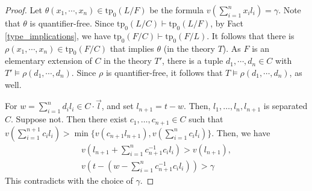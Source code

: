 \documentclass[12pt]{article}
\newcommand{\tpp}{\mathrm{tp}}
\newcommand{\dcl}{\mathrm{dcl}}
\newcommand{\val}{\textit{v}}
\newcommand{\0}{\emptyset}
\theoremstyle{plain}%
\theoremstyle{definition}
\theoremstyle{remark}
\begin{document}
\begin{proof}
Let $\theta(x_1,\cdots,x_n)\in \tpp_0(L/F)$ be the formula $\val(\sum\limits_{i=1}^{n} x_il_i)=\gamma$. Note that $\theta$ is quantifier-free. 
Since $\tpp_0(L/C)\vdash \tpp_0(L/F)$, by Fact \ref{type_implications}, we have $\tpp_0(F/C)\vdash \tpp_0(F/L)$. It follows that there is $\rho(x_1,\cdots, x_n)\in \tpp_0(F/C)$ that implies $\theta$ (in the theory $T$). As $F$ is an elementary extension of $C$ in the theory $T'$, there is a tuple $d_1,\cdots, d_n\in C$ with $T'\models \rho(d_1,\cdots, d_n)$. Since $\rho$ is quantifier-free, it follows that $T\models \rho(d_1,\cdots, d_n)$, as well. 

For $w=\sum\limits_{i=1}^n d_i l_{i}\in C\cdot \vec{l}$,
and set  $l_{n+1}=t-w$. Then, $l_1,\dots,l_n,l_{n+1}$ is separated $C$. Suppose not. Then there exist $c_1,\dots,c_{n+1}\in C$ such that $\val(\sum\limits_{i=1}^{n+1}c_il_i)>\min\{\val(c_{n+1}l_{n+1}), \val(\sum\limits_{i=1}^nc_il_i)\}$. Then, we have\begin{align*}
    \val(l_{n+1}+\sum\limits_{i=1}^nc_{n+1}^{-1}c_il_i)>\val(l_{n+1}),\\
    \val(t-(w-\sum\limits_{i=1}^nc_{n+1}^{-1}c_il_i))>\gamma
\end{align*}
This contradicts with the choice of $\gamma$. \end{proof}

\end{document}
